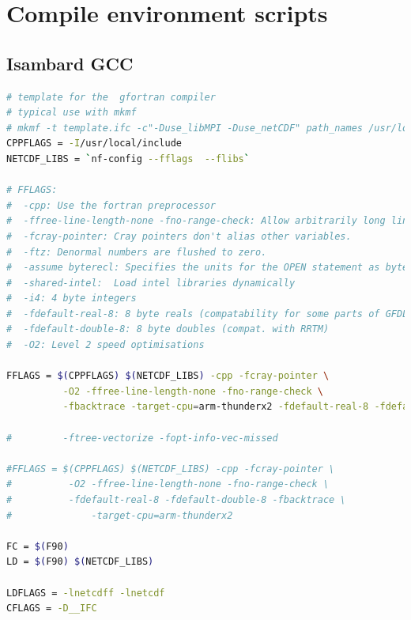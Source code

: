 \documentclass[a4paper,11pt]{report}
\begin{document}
\chapter{Compile environment scripts}
\label{apdx:compile-env}

\section*{Isambard GCC}

\begin{lstlisting}[language=Bash, caption={Environment file for Isambard using GCC.}]
# template for the  gfortran compiler
# typical use with mkmf
# mkmf -t template.ifc -c"-Duse_libMPI -Duse_netCDF" path_names /usr/local/include
CPPFLAGS = -I/usr/local/include
NETCDF_LIBS = `nf-config --fflags  --flibs`

# FFLAGS:
#  -cpp: Use the fortran preprocessor
#  -ffree-line-length-none -fno-range-check: Allow arbitrarily long lines
#  -fcray-pointer: Cray pointers don't alias other variables.
#  -ftz: Denormal numbers are flushed to zero.
#  -assume byterecl: Specifies the units for the OPEN statement as bytes.
#  -shared-intel:  Load intel libraries dynamically
#  -i4: 4 byte integers
#  -fdefault-real-8: 8 byte reals (compatability for some parts of GFDL code)
#  -fdefault-double-8: 8 byte doubles (compat. with RRTM)
#  -O2: Level 2 speed optimisations

FFLAGS = $(CPPFLAGS) $(NETCDF_LIBS) -cpp -fcray-pointer \
          -O2 -ffree-line-length-none -fno-range-check \
          -fbacktrace -target-cpu=arm-thunderx2 -fdefault-real-8 -fdefault-double-8

#         -ftree-vectorize -fopt-info-vec-missed

#FFLAGS = $(CPPFLAGS) $(NETCDF_LIBS) -cpp -fcray-pointer \
#          -O2 -ffree-line-length-none -fno-range-check \
#          -fdefault-real-8 -fdefault-double-8 -fbacktrace \
#              -target-cpu=arm-thunderx2 

FC = $(F90)
LD = $(F90) $(NETCDF_LIBS)

LDFLAGS = -lnetcdff -lnetcdf 
CFLAGS = -D__IFC
\end{lstlisting}
\end{document}
